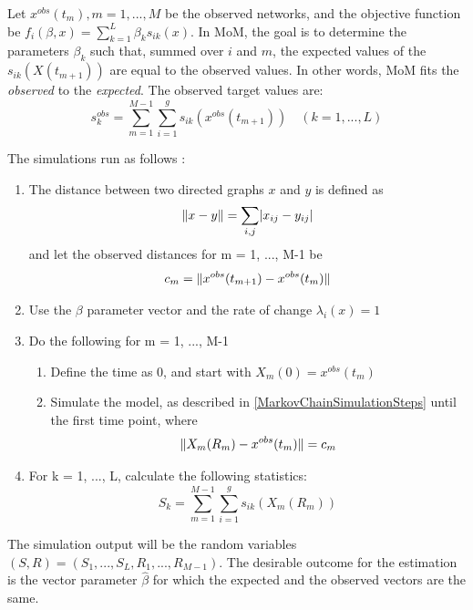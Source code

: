 \documentclass[11pt]{report}
\DeclarePairedDelimiter{\abs}{\lvert}{\rvert}
\DeclarePairedDelimiter{\norm}{\lVert}{\rVert}
\begin{document}
Let $x^{obs}(t_m), m = 1, ..., M$ be the observed networks, and the objective function be $f_i(\beta, x) = \sum_{k=1}^L \beta_k s_{ik}(x)$. 
In MoM, the goal is to determine the parameters $\beta_k$ such that, summed over $i$ and $m$, the expected values of the $s_{ik}(X(t_{m+1}))$ are equal to the observed values. In other words, MoM fits the \textit{observed} to the \textit{expected}. 
The observed target values are:
\begin{equation}
s_k^{obs} = \sum_{m=1}^{M-1}\sum_{i=1}^g s_{ik}(x^{obs}(t_{m+1})) \quad (k = 1, ..., L)
\end{equation}

The simulations run as follows \cite{Snijders2004}:
\begin{enumerate}
\item The distance between two directed graphs $x$ and $y$ is defined as
\begin{equation}
\norm{x -y} = \sum_{i,j}\abs{x_{ij} - y_{ij}}
\end{equation}
and let the observed distances for m = 1, ..., M-1 be 
\begin{equation}
c_m = \norm{x^{obs}(t_{m+1})-x^{obs}(t_m)}
\end{equation}
\item Use the $\beta$ parameter vector and the rate of change $\lambda_{i}(x) = 1$

\item Do the following for m = 1, ..., M-1
\begin{enumerate}
\item Define the time as 0, and start with $X_m(0) = x^{obs}(t_m)$
\item Simulate the model, as described in \ref{MarkovChainSimulationSteps} until the first time point, where 
\begin{equation}
\norm{X_m(R_m) - x^{obs}(t_m)} = c_m
\end{equation}
\end{enumerate}
\item For k = 1, ..., L, calculate the following statistics:
\begin{equation}
S_k = \sum_{m = 1}^{M-1}\sum_{i=1}^{g}s_{ik}(X_m(R_m))
\end{equation}
\end{enumerate}

The simulation output will be the random variables $(S,R) = (S_1,...,S_L,R_1,...,R_{M-1})$. The desirable outcome for the estimation is the vector parameter $\hat{\beta}$ for which the expected and the observed vectors are the same. 
\end{document}
